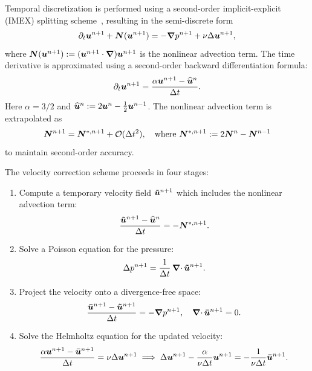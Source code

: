 \documentclass[../main.tex]{subfiles}
\begin{document}
Temporal discretization is performed using a second-order implicit-explicit (IMEX) splitting scheme~\cite{velocitycorrectionscheme}, resulting in the semi-discrete form
\begin{equation}
	\partial_t\bm{u}^{n+1}+ \bm{N}(\bm{u}^{n+1}) = - \grad p^{n+1} + \nu \Delta \bm{u}^{n+1},
	\label{eq:nsdiscretized}
\end{equation}
where $\bm{N}(\bm{u}^{n+1}) := (\bm{u}^{n+1} \cdot \grad) \bm{u}^{n+1}$ is the nonlinear advection term. The time derivative is approximated using a second-order backward differentiation formula:
\begin{equation}
	\partial_t{\bm{u}^{n+1}}= \frac{\alpha \bm{u}^{n+1} - \bm{\widehat{u}}^n}{\Delta t}.
	\label{eq:timederivative}
\end{equation}
Here $\alpha = 3/2$ and $\bm{\widehat{u}}^n := 2\bm{u}^n - \frac{1}{2}\bm{u}^{n-1}$. The nonlinear advection term is extrapolated as
\begin{equation}
	\bm{N}^{n+1} = \bm{N}^{*,n+1} + \mathcal{O}(\Delta t^2), \quad \text{where } \bm{N}^{*,n+1} := 2\bm{N}^n - \bm{N}^{n-1}
	\label{eq:nonlinearextrapolation}
\end{equation}
to maintain second-order accuracy.

The velocity correction scheme proceeds in four stages:
\begin{enumerate}
	\item Compute a temporary velocity field $\bm{\tilde{u}}^{n+1}$ which includes the nonlinear advection term:
	      \begin{equation}
		      \frac{\bm{\tilde{u}}^{n+1} - \bm{\widehat{u}}^n}{\Delta t} = -\bm{N}^{*,n+1}.
		      \label{eq:tempvelocity}
	      \end{equation}
	\item Solve a Poisson equation for the pressure:
	      \begin{equation}
		      \Delta p^{n+1} = \frac{1}{\Delta t} \operatorname{\bm{\nabla}\cdot} \bm{\tilde{u}}^{n+1}.
		      \label{eq:poissonpressure}
	      \end{equation}
	\item Project the velocity onto a divergence-free space:
	      \begin{equation}
		      \frac{\bm{\bar{u}}^{n+1} - \bm{\tilde{u}}^{n+1}}{\Delta t} = - \grad p^{n+1}, \quad \operatorname{\bm{\nabla}\cdot} \bm{\bar{u}}^{n+1} = 0.
		      \label{eq:tempvelocitypressure}
	      \end{equation}
	\item Solve the Helmholtz equation for the updated velocity:
	      \begin{equation}
		      \frac{\alpha\bm{u}^{n+1} - \bm{\bar{u}}^{n+1}}{\Delta t} = \nu \Delta \bm{u}^{n+1} \implies
		      \Delta \bm{u}^{n+1} - \frac{\alpha}{\nu \Delta t} \bm{u}^{n+1} = - \frac{1}{\nu \Delta t} \bm{\bar{u}}^{n+1} .
					\label{eq:helmholtzvelocity}
	      \end{equation}
\end{enumerate}
\end{document}
